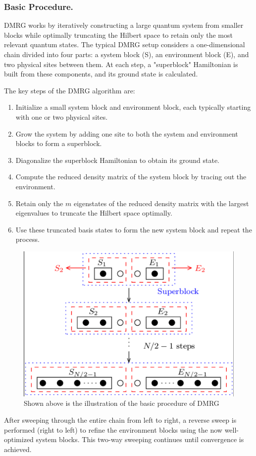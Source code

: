 \documentclass[pre,twocolumn,floatfix]{revtex4-1}
\begin{document}
\subsubsection{Basic Procedure.}
DMRG works by iteratively constructing a large quantum system from smaller blocks while optimally truncating the Hilbert space to retain only the most relevant quantum states. The typical DMRG setup considers a one-dimensional chain divided into four parts: a system block (S), an environment block (E), and two physical sites between them. At each step, a "superblock" Hamiltonian is built from these components, and its ground state is calculated.

The key steps of the DMRG algorithm are:
\begin{enumerate}
    \item Initialize a small system block and environment block, each typically starting with one or two physical sites.
    \item Grow the system by adding one site to both the system and environment blocks to form a superblock.
    \item Diagonalize the superblock Hamiltonian to obtain its ground state.
    \item Compute the reduced density matrix of the system block by tracing out the environment.
    \item Retain only the $m$ eigenstates of the reduced density matrix with the largest eigenvalues to truncate the Hilbert space optimally.
    \item Use these truncated basis states to form the new system block and repeat the process.
\end{enumerate}

\begin{figure}
    \centering
    \includegraphics[width=0.5\linewidth]{屏幕截图 2025-05-30 165036.png}
    \caption{Shown above is the illustration of the basic procedure of DMRG}
    \label{fig:enter-label}
\end{figure}

After sweeping through the entire chain from left to right, a reverse sweep is performed (right to left) to refine the environment blocks using the now well-optimized system blocks. This two-way sweeping continues until convergence is achieved.
\end{document}
